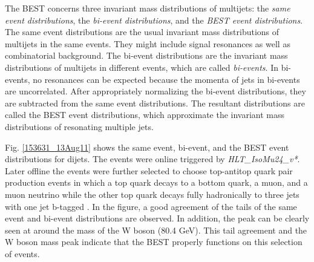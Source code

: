 The BEST concerns three invariant mass distributions of multijets: the
\textit{same event distributions}, the \textit{bi-event distributions},
and the \textit{BEST event distributions}. The same event distributions
are the usual invariant mass distributions of multijets in the same
events. They might include signal resonances as well as combinatorial
background. The bi-event distributions are the invariant mass
distributions of multijets in different events, which are called
\textit{bi-events}. In bi-events, no resonances can be expected because
the momenta of jets in bi-events are uncorrelated. After appropriately
normalizing the bi-event distributions, they are subtracted from the
same event distributions. The resultant distributions are called the
BEST event distributions, which approximate the invariant mass
distributions of resonating multiple jets.

Fig. \ref{153631_13Aug11} shows the same event, bi-event, and the BEST
event distributions for dijets. The events were online triggered by
\textit{HLT\_IsoMu24\_v*}. Later offline the events were further
selected to choose top-antitop quark pair production events in which a
top quark decays to a bottom quark, a muon, and a muon neutrino while
the other top quark decays fully hadronically to three jets with one jet
b-tagged \cite{CMS-AN-2011-396}. In the figure, a good agreement of the
tails of the same event and bi-event distributions are observed. In
addition, the peak can be clearly seen at around the mass of the W boson
(80.4 GeV). This tail agreement and the W boson mass peak indicate that
the BEST properly functions on this selection of events.

